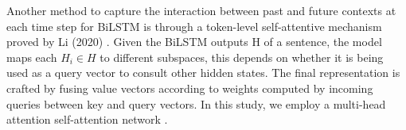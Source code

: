 \documentclass[lettersize,journal]{IEEEtran}
\begin{document}
\begin{table}[t]
\centering
{}
\caption{Comparison between CRF and global context mechanism on pure BiLSTM.\label{tab:table5}}
\end{table}

\begin{table}[]
\centering
{}
\caption{Result on POS tagging.\label{tab:table6}}
\end{table}

Another method to capture the interaction between past and future contexts at each time step for BiLSTM is through a token-level self-attentive mechanism proved by Li  (2020) \cite{Li2020}. Given the BiLSTM outputs H of a sentence, the model maps each $H_i \in H$ to different subspaces, this depends on whether it is being used as a query vector to consult other hidden states. The final representation is crafted by fusing value vectors according to weights computed by incoming queries between key and query vectors. In this study, we employ a multi-head attention self-attention network \cite{Vaswani2017}.
\end{document}
